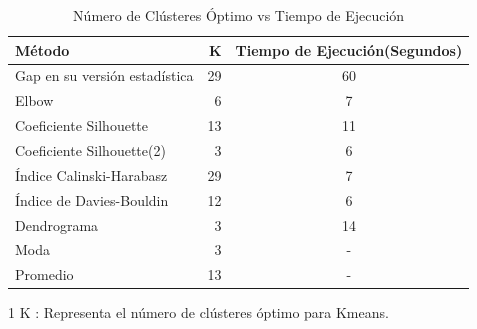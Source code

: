 \begin{table}[h!]
	 \begin{threeparttable}
	\begin{center}
		\begin{tabular}{| l | r | c |}
			\hline
			Método & K \tnote{1}  & Tiempo de Ejecución(Segundos) \\ \hline
			Gap en su versión estadística & 29 & 60 \\
			Elbow & 6 & 7 \\
			Coeficiente Silhouette & 13 & 11 \\
			Coeficiente Silhouette(2) & 3 & 6 \\
			Índice Calinski-Harabasz & 29 & 7 \\
			Índice de Davies-Bouldin & 12 & 6 \\
			Dendrograma & 3 & 14 \\
			Moda & 3 & -\\
			Promedio & 13 & - \\ \hline
		\end{tabular}
		\begin{tablenotes}
		\item[1] K : Representa el número de clústeres óptimo para Kmeans.
		
		\end{tablenotes}  
		\caption{Número de Clústeres Óptimo vs Tiempo de Ejecución}
		\label{tab:resumenMetodos}
	\end{center}
	 \end{threeparttable}
\end{table}



